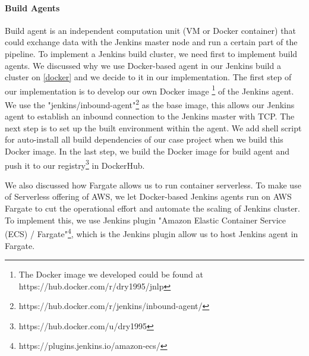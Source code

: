 \paragraph[]{Build Agents}
Build agent is an independent computation unit (VM or Docker container) that could exchange data with the Jenkins master node and run a certain part of the pipeline. To implement a Jenkins build cluster, we need first to implement build agents.
We discussed why we use Docker-based agent in our Jenkins build a cluster on \ref{docker} and we decide to it in our implementation. The first step of our implementation is to develop our own Docker image \footnote{The Docker image we developed could be found at https://hub.docker.com/r/dry1995/jnlp} of the Jenkins agent. We use the "jenkins/inbound-agent"\footnote{https://hub.docker.com/r/jenkins/inbound-agent/} as the base image, this allows our Jenkins agent to establish an inbound connection to the Jenkins master with TCP. The next step is to set up the built environment within the agent. We add shell script for auto-install all build dependencies of our case project when we build this Docker image. In the last step, we build the Docker image for build agent and push it to our registry\footnote{https://hub.docker.com/u/dry1995} in DockerHub. 
\par
We also discussed how Fargate allows us to run container serverless. To make use of Serverless offering of AWS, we let Docker-based Jenkins agents run on AWS Fargate to cut the operational effort and automate the scaling of Jenkins cluster. To implement this, we use Jenkins plugin "Amazon Elastic Container Service (ECS) / Fargate"\footnote{https://plugins.jenkins.io/amazon-ecs/}, which is the Jenkins plugin allow us to host Jenkins agent in Fargate.  
